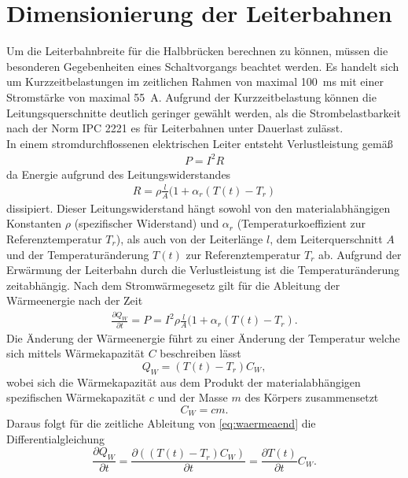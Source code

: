 \section{Dimensionierung der Leiterbahnen}
Um die Leiterbahnbreite für die Halbbrücken berechnen zu können, müssen die besonderen Gegebenheiten eines Schaltvorgangs beachtet werden. Es handelt sich um Kurzzeitbelastungen im zeitlichen Rahmen von maximal \SI{100}{ms} mit einer Stromstärke von maximal \SI{55}{A}. Aufgrund der Kurzzeitbelastung können die Leitungsquerschnitte deutlich geringer gewählt werden, als die Strombelastbarkeit nach der Norm IPC 2221 es für Leiterbahnen unter Dauerlast zulässt.\\
In einem stromdurchflossenen elektrischen Leiter entsteht Verlustleistung gemäß
\begin{align*}
P = I^{2}R
\end{align*}
da Energie aufgrund des Leitungswiderstandes 
\begin{align*}
R = \rho \frac{l}{A}(1+\alpha_{r}(T(t)-T_{r})
\end{align*}
dissipiert. Dieser Leitungswiderstand hängt sowohl von den materialabhängigen Konstanten $\rho$ (spezifischer Widerstand) und $\alpha_{r}$ (Temperaturkoeffizient zur Referenztemperatur $T_{r}$), als auch von der Leiterlänge $l$, dem Leiterquerschnitt $A$ und der Temperaturänderung $T(t)$ zur Referenztemperatur $T_{r}$ ab. Aufgrund der Erwärmung der Leiterbahn durch die Verlustleistung ist die Temperaturänderung zeitabhängig. Nach dem Stromwärmegesetz gilt für die Ableitung der Wärmeenergie nach der Zeit
\begin{align}
\label{eq:dif2}
\frac{\partial Q_{W}}{\partial t} = P = I^{2}\rho \frac{l}{A}(1+\alpha_{r}(T(t)-T_{r}).
\end{align}
Die Änderung der Wärmeenergie führt zu einer Änderung der Temperatur welche sich mittels Wärmekapazität $C$ beschreiben lässt
\begin{equation}
\label{eq:waermeaend}
 Q_{W} = (T(t)-T_{r})C_W,
\end{equation}
wobei sich die Wärmekapazität aus dem Produkt der materialabhängigen spezifischen Wärmekapazität $c$ und der Masse $m$ des Körpers zusammensetzt
\begin{equation}
C_W = c m.
\end{equation}
Daraus folgt für die zeitliche Ableitung von \autoref{eq:waermeaend} die Differentialgleichung
\begin{equation}
\label{eq:dif1}
\frac{\partial Q_W}{\partial t} = \frac{\partial ((T(t)-T_{r})C_W)}{\partial t} = \frac{\partial T(t)}{\partial t}C_W.
\end{equation}
